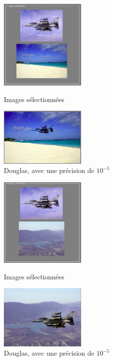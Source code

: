 \begin{figure}[!h]
   \begin{minipage}{0.5\textwidth}
     \centering
     \includegraphics[width = 120pt]{Images/Resultats/douglas3b.png}
     \caption{Images sélectionnées}
      \end{minipage}\hfill
   \begin{minipage}{0.5\textwidth}
     \centering
     \includegraphics[width = 120pt]{Images/Resultats/douglas3.png}
     \caption{Douglas, avec une précision de $10^{-5}$}
      \end{minipage}\hfill
\end{figure}
\begin{figure}[!htb]
   \begin{minipage}{0.5\textwidth}
     \centering
     \includegraphics[width = 120pt]{Images/Resultats/douglas4b.png}
     \caption{Images sélectionnées}
      \end{minipage}\hfill
   \begin{minipage}{0.5\textwidth}
     \centering
     \includegraphics[width = 120pt]{Images/Resultats/douglas4.png}
     \caption{Douglas, avec une précision de $10^{-5}$}
      \end{minipage}\hfill
\end{figure}
\newpage
